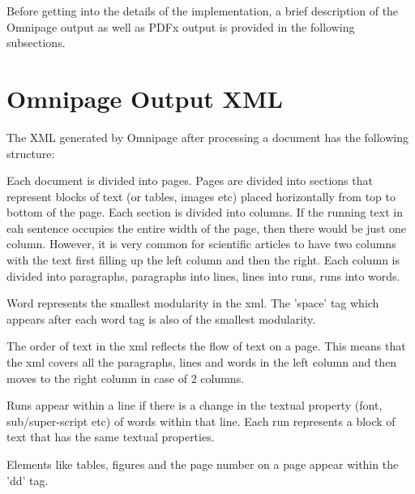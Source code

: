 Before getting into the details of the implementation, a brief description of the Omnipage output as well as PDFx output is provided in the following subsections.

\section{Omnipage Output XML}
The XML generated by Omnipage after processing a document has the following structure:
\begin{itemsize}
\item Each document is divided into pages.
  Pages are divided into sections that represent blocks of text (or tables, images etc) placed horizontally from top to bottom of the page.
  Each section is divided into columns.
  If the running text in eah sentence occupies the entire width of the page, then there would be just one column.
  However, it is very common for scientific articles to have two columns with the text first filling up the left column and then the right.
  Each column is divided into paragraphs, paragraphs into lines, lines into runs, runs into words.
\item Word represents the smallest modularity in the xml.
  The 'space' tag which appears after each word tag is also of the smallest modularity.
\item The order of text in the xml reflects the flow of text on a page.
  This means that the xml covers all the paragraphs, lines and words in the left column and then moves to the right column in case of 2 columns.
\item Runs appear within a line if there is a change in the textual property (font, sub/super-script etc) of words within that line.
  Each run represents a block of text that has the same textual properties.
\item Elements like tables, figures and the page number on a page appear within the 'dd' tag.
\end{itemsize}

